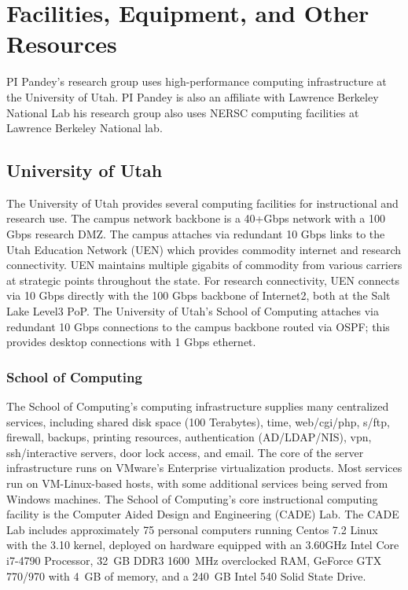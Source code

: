 
\section*{Facilities, Equipment, and Other Resources}

PI Pandey's research group uses high-performance computing infrastructure at the University of Utah. PI Pandey is also an affiliate with Lawrence Berkeley National Lab his research group also uses NERSC computing facilities at Lawrence Berkeley National lab.

\subsection*{University of Utah}
The University of Utah provides several computing facilities for instructional and research use. The campus network backbone is a 40+Gbps network with a 100 Gbps research DMZ\@. The campus attaches via redundant 10 Gbps links to the Utah Education Network (UEN) which provides commodity internet and research connectivity. UEN maintains multiple gigabits of commodity from various carriers at strategic points throughout the state. For research connectivity, UEN connects via 10 Gbps directly with the 100 Gbps backbone of Internet2, both at the Salt Lake Level3 PoP. The University of Utah’s School of Computing attaches via redundant 10 Gbps connections to the campus backbone routed via OSPF\@; this provides desktop connections with 1 Gbps ethernet.

\subsubsection*{School of Computing}
The School of Computing’s computing infrastructure supplies many centralized services, including shared disk space (100 Terabytes), time, web/cgi/php, s/ftp, firewall, backups, printing resources, authentication (AD/LDAP/NIS), vpn, ssh/interactive servers, door lock access, and email. The core of the server infrastructure runs on VMware’s Enterprise virtualization products. Most services run on VM-Linux-based hosts, with some additional services being served from Windows machines. The School of Computing’s core instructional computing facility is the Computer Aided Design and Engineering (CADE) Lab. The CADE Lab includes approximately 75 personal computers running Centos 7.2 Linux with the 3.10 kernel, deployed on hardware equipped with an 3.60GHz Intel Core i7-4790 Processor, 32~GB DDR3 1600~MHz overclocked RAM, GeForce GTX 770/970 with 4~GB of memory, and a 240~GB Intel 540 Solid State Drive.

